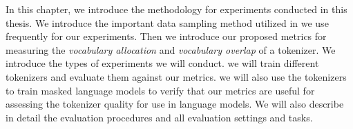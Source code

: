 

In this chapter, we introduce the methodology for experiments conducted in this thesis. We introduce the important data sampling method utilized in \citet{devlin_bert_2019,conneau_unsupervised_2020} we use frequently for our experiments.
Then we introduce our proposed metrics for measuring the \textit{vocabulary allocation} and \textit{vocabulary overlap} of a tokenizer. 
We introduce the types of experiments we will conduct. 
 we will train different tokenizers and evaluate them against our metrics.
 we will also use the tokenizers to train masked language models to verify that our metrics are useful for assessing the tokenizer quality for use in language models. We will also describe in detail the evaluation procedures and all evaluation settings and tasks. 




